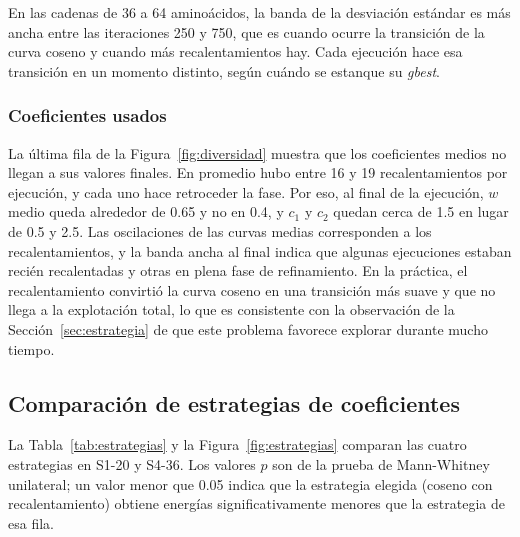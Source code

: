 En las cadenas de 36 a 64 aminoácidos, la banda de la desviación estándar es más ancha entre las iteraciones 250 y 750, que es cuando ocurre la transición de la curva coseno y cuando más recalentamientos hay. Cada ejecución hace esa transición en un momento distinto, según cuándo se estanque su \textit{gbest}.

\subsubsection{Coeficientes usados}

La última fila de la Figura~\ref{fig:diversidad} muestra que los coeficientes medios no llegan a sus valores finales. En promedio hubo entre 16 y 19 recalentamientos por ejecución, y cada uno hace retroceder la fase. Por eso, al final de la ejecución, $w$ medio queda alrededor de 0.65 y no en 0.4, y $c_1$ y $c_2$ quedan cerca de 1.5 en lugar de 0.5 y 2.5. Las oscilaciones de las curvas medias corresponden a los recalentamientos, y la banda ancha al final indica que algunas ejecuciones estaban recién recalentadas y otras en plena fase de refinamiento. En la práctica, el recalentamiento convirtió la curva coseno en una transición más suave y que no llega a la explotación total, lo que es consistente con la observación de la Sección~\ref{sec:estrategia} de que este problema favorece explorar durante mucho tiempo.

\subsection{Comparación de estrategias de coeficientes}
\label{sec:res_estrategias}

La Tabla~\ref{tab:estrategias} y la Figura~\ref{fig:estrategias} comparan las cuatro estrategias en S1-20 y S4-36. Los valores $p$ son de la prueba de Mann-Whitney unilateral; un valor menor que 0.05 indica que la estrategia elegida (coseno con recalentamiento) obtiene energías significativamente menores que la estrategia de esa fila.

